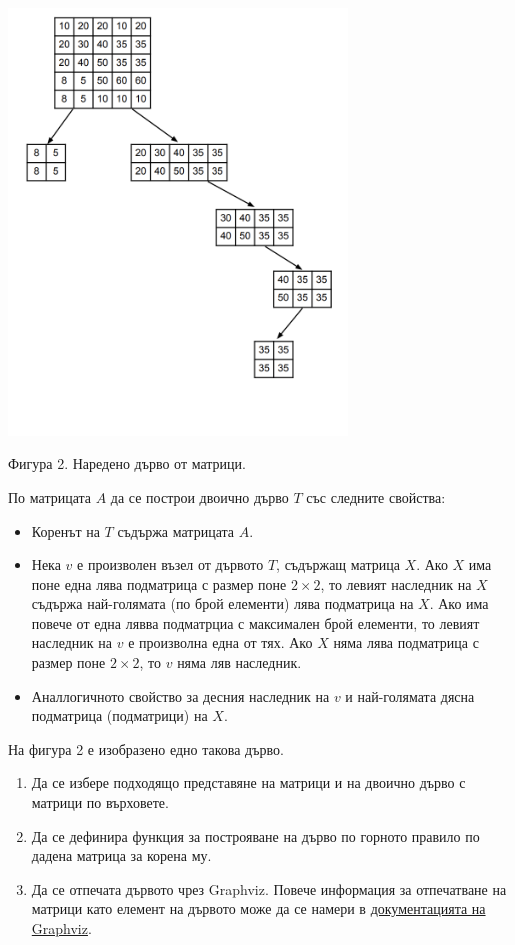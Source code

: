 \documentclass[12pt,a4paper]{article}
\begin{document}
\begin{enumerate}
	\begin{flushleft}
	\includegraphics[width=9cm]{images/tree3}

	Фигура 2. Наредено дърво от матрици.
	\end{flushleft}

	По матрицата $A$ да се построи двоично дърво $T$ със следните свойства:

	\begin{itemize}
		\item Коренът на $T$ съдържа матрицата $A$.
		\item Нека $v$ е произволен възел от дървото $T$, съдържащ матрица $X$. Ако $X$ има поне една лява подматрица с размер поне $2 \times 2$, то левият наследник на $X$ съдържа най-голямата (по брой елементи) лява подматрица на $X$. Ако има повече от една лявва подматрциа с максимален брой елементи, то левият наследник на $v$ е произволна една от тях. Ако $X$ няма лява подматрица с размер поне $2 \times 2$, то $v$ няма ляв наследник.
		\item Аналлогичното свойство за десния наследник на $v$ и най-голямата дясна подматрица (подматрици) на $X$.
	\end{itemize}

	На фигура 2 е изобразено едно такова дърво.

	\begin{enumerate}
		\item Да се избере подходящо представяне на матрици и на двоично дърво с матрици по върховете.
		\item Да се дефинира функция за построяване на дърво по горното правило по дадена матрица за корена му.
		\item Да се отпечата дървото чрез Graphviz. Повече информация за отпечатване на матрици като елемент на дървото може да се намери в \href{http://www.graphviz.org/content/node-shapes}{документацията на Graphviz}.
	\end{enumerate}



\end{enumerate}
\end{document}
